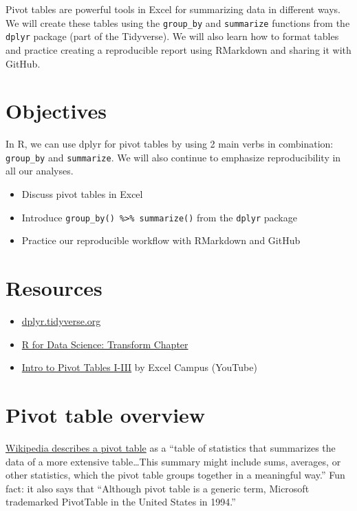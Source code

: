 \documentclass[]{book}
\providecommand{\tightlist}{%
  \setlength{\itemsep}{0pt}\setlength{\parskip}{0pt}}
\begin{document}
Pivot tables are powerful tools in Excel for summarizing data in different ways. We will create these tables using the \texttt{group\_by} and \texttt{summarize} functions from the \texttt{dplyr} package (part of the Tidyverse). We will also learn how to format tables and practice creating a reproducible report using RMarkdown and sharing it with GitHub.

\hypertarget{objectives-3}{%
\section{Objectives}\label{objectives-3}}

In R, we can use dplyr for pivot tables by using 2 main verbs in combination: \texttt{group\_by} and \texttt{summarize}. We will also continue to emphasize reproducibility in all our analyses.

\begin{itemize}
\tightlist
\item
  Discuss pivot tables in Excel
\item
  Introduce \texttt{group\_by()\ \%\textgreater{}\%\ summarize()} from the \texttt{dplyr} package
\item
  Practice our reproducible workflow with RMarkdown and GitHub
\end{itemize}

\hypertarget{resources-4}{%
\section{Resources}\label{resources-4}}

\begin{itemize}
\tightlist
\item
  \href{https://dplyr.tidyverse.org/}{dplyr.tidyverse.org}
\item
  \href{https://r4ds.had.co.nz/transform.html}{R for Data Science: Transform Chapter}
\item
  \href{https://youtu.be/g530cnFfk8Y}{Intro to Pivot Tables I-III} by Excel Campus (YouTube)
\end{itemize}

\hypertarget{pivot-table-overview}{%
\section{Pivot table overview}\label{pivot-table-overview}}

\href{https://en.wikipedia.org/wiki/Pivot_table}{Wikipedia describes a pivot table} as a ``table of statistics that summarizes the data of a more extensive table\ldots{}This summary might include sums, averages, or other statistics, which the pivot table groups together in a meaningful way.'' Fun fact: it also says that ``Although pivot table is a generic term, Microsoft trademarked PivotTable in the United States in 1994.''
\end{document}
